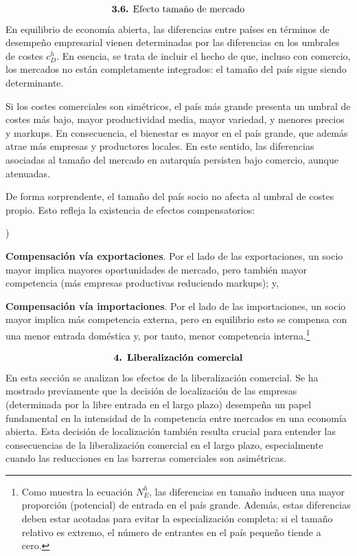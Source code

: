 \documentclass[10pt,a4paper]{article}
\newcounter{alphaitem}
\newenvironment{la}
      {\begin{list}{\alph{alphaitem})}{%
          \usecounter{alphaitem}%
          \setlength{\leftmargin}{1cm}%
          \setlength{\parskip}{3pt}%
          \setlength{\itemsep}{0pt}%
          \setlength{\parsep}{0pt}%
      }}
      {\end{list}}
\begin{document}
$$\text{\textbf{3.6.} Efecto tamaño de mercado}$$
En equilibrio de economía abierta, las diferencias entre países en términos de desempeño empresarial vienen determinadas por las diferencias en los umbrales de costes $c_D^h$. En esencia, se trata de incluir el hecho de que, incluso con comercio, los mercados no están completamente integrados: el tamaño del país sigue siendo determinante. 

Si los costes comerciales son simétricos, el país más grande presenta un umbral de costes más bajo, mayor productividad media, mayor variedad, y menores precios y markups. En consecuencia, el bienestar es mayor en el país grande, que además atrae más empresas y productores locales. En este sentido, las diferencias asociadas al tamaño del mercado en autarquía persisten bajo comercio, aunque atenuadas.

De forma sorprendente, el tamaño del país socio no afecta al umbral de costes propio. Esto refleja la existencia de efectos compensatorios:
\begin{la}
    \item \textbf{Compensación vía exportaciones}. Por el lado de las exportaciones, un socio mayor implica mayores oportunidades de mercado, pero también mayor competencia (más empresas productivas reduciendo markups); y,
    \item \textbf{Compensación vía importaciones}. Por el lado de las importaciones, un socio mayor implica más competencia externa, pero en equilibrio esto se compensa con una menor entrada doméstica y, por tanto, menor competencia interna.\footnote{%
        Como muestra la ecuación $N_E^h$, las diferencias en tamaño inducen una mayor proporción (potencial) de entrada en el país grande. Además, estas diferencias deben estar acotadas para evitar la especialización completa: si el tamaño relativo es extremo, el número de entrantes en el país pequeño tiende a cero.
    }
\end{la}


$$\text{\textbf{4. Liberalización comercial}}$$
En esta sección se analizan los efectos de la liberalización comercial. Se ha mostrado previamente que la decisión de localización de las empresas (determinada por la libre entrada en el largo plazo) desempeña un papel fundamental en la intensidad de la competencia entre mercados en una economía abierta. Esta decisión de localización también resulta crucial para entender las consecuencias de la liberalización comercial en el largo plazo, especialmente cuando las reducciones en las barreras comerciales son asimétricas.
\end{document}
